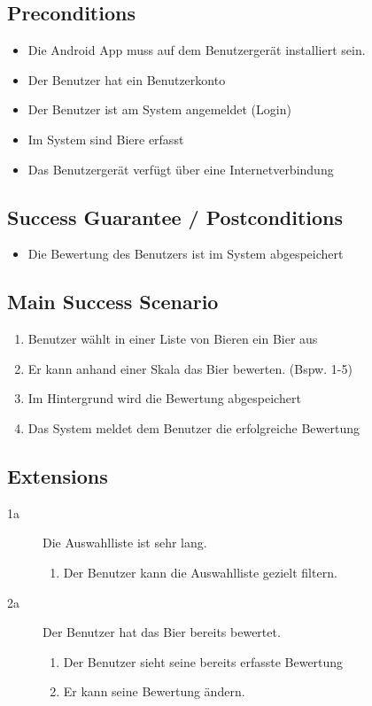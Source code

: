 \documentclass[10pt,a4paper]{scrartcl}
\begin{document}
\subsection*{Preconditions}

\begin{itemize}
\item Die Android App muss auf dem Benutzergerät installiert sein.
\item Der Benutzer hat ein Benutzerkonto
\item Der Benutzer ist am System angemeldet (Login)
\item Im System sind Biere erfasst
\item Das Benutzergerät verfügt über eine Internetverbindung
\end{itemize}


\subsection*{Success Guarantee / Postconditions}
\begin{itemize}
\item Die Bewertung des Benutzers ist im System abgespeichert
\end{itemize}


\subsection*{Main Success Scenario}

\begin{enumerate}
\item Benutzer wählt in einer Liste von Bieren ein Bier aus
\item Er kann anhand einer Skala das Bier bewerten. (Bspw. 1-5)
\item Im Hintergrund wird die Bewertung abgespeichert
\item Das System meldet dem Benutzer die erfolgreiche Bewertung
\end{enumerate}


\subsection*{Extensions}

\begin{description}
\item[1a] Die Auswahlliste ist sehr lang.
	\begin{enumerate}
	\item Der Benutzer kann die Auswahlliste gezielt filtern.
	\end{enumerate}
\item[2a] Der Benutzer hat das Bier bereits bewertet.
	\begin{enumerate}
	\item Der Benutzer sieht seine bereits erfasste Bewertung
	\item Er kann seine Bewertung ändern.
	\end{enumerate}

\end{description}
\end{document}
